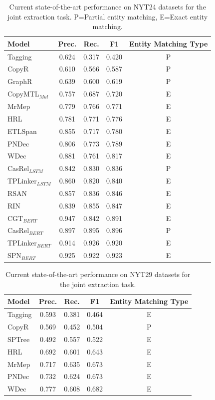 \begin{table}[ht]
\small
\centering
\begin{tabular}{l|cccc}
\hline
Model   & Prec.     & Rec.      & F1   & Entity Matching Type     \\ \hline
Tagging  & 0.624     & 0.317     & 0.420  & P     \\
CopyR   & 0.610     & 0.566     & 0.587 & P     \\
GraphR   & 0.639 & 0.600 & 0.619 & P  \\
CopyMTL$_{Mul}$  & 0.757 & 0.687 & 0.720 & E \\
MrMep        & 0.779  & 0.766   & 0.771  & E    \\
HRL        & 0.781    & 0.771    & 0.776  & E   \\
ETLSpan  & 0.855    & 0.717    & 0.780  & E   \\
PNDec        & 0.806 & 0.773 & 0.789     & E    \\
WDec        & 0.881 & 0.761 & 0.817     & E     \\
CasRel$_{LSTM}$         & 0.842    & 0.830   &  0.836    & P  \\
TPLinker$_{LSTM} $ & 0.860 & 0.820 & 0.840 & E  \\ 
RSAN  & 0.857    & 0.836    & 0.846  & E   \\ 
RIN  & 0.839 & 0.855 & 0.847 & E \\ \hline
CGT$_{BERT}$   & 0.947 & 0.842 & 0.891 & E \\
CasRel$_{BERT}$         & 0.897    & 0.895   &  0.896    & P   \\ 
TPLinker$_{BERT} $ & 0.914 & 0.926 & 0.920 & E  \\ 
SPN$_{BERT}$  & 0.925 & 0.922 & 0.923 & E  \\ \hline
\end{tabular}
\caption{Current state-of-the-art performance on NYT24 datasets for the joint extraction task. P=Partial entity matching, E=Exact entity matching.}
\label{tab:nyt24_joint_sota}
\end{table}
\begin{table}[ht]
\small
\centering
\begin{tabular}{l|cccc}
\hline
Model    & Prec.      & Rec.      & F1   & Entity Matching Type  \\ \hline
Tagging      & 0.593     & 0.381     & 0.464     & E        \\
CopyR   &  0.569    &  0.452    &  0.504     &   P          \\
SPTree    & 0.492 & 0.557 & 0.522   & E     \\
HRL     & 0.692 & 0.601 & 0.643     & E   \\
MrMep     & 0.717    & 0.635  & 0.673   & E    \\
PNDec  & 0.732 & 0.624 & 0.673  & E \\ 
WDec  & 0.777 & 0.608 & 0.682     & E   \\ \hline
\end{tabular}
\caption{Current state-of-the-art performance on NYT29 datasets for the joint extraction task.}
\label{tab:nyt29_joint_sota}
\end{table}
